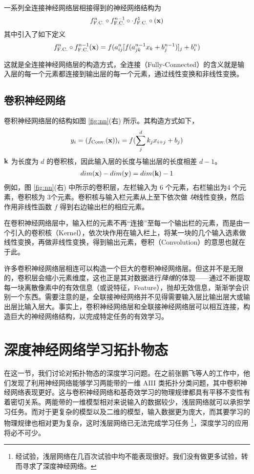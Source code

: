 一系列全连接神经网络层相接得到的神经网络结构为
\begin{align}
f_{\text{F.C.}}^n\circ f_{\text{F.C.}}^{n-1}\circ \cdot f_{\text{F.C.}}^1\circ(\mathbf{x})
\end{align}
其中引入了如下定义
\begin{align}
f_{\text{F.C.}}^{n}\circ f_{\text{F.C.}}^{n-1}(\mathbf{x})
= f(a^{n}_{ij}[f(a^{n-1}_{jk}x_k + b^{n-1}_j)]_{j} + b^n_i)
\end{align}

这就是全连接神经网络层的构造方式，全连接（Fully-Connected）的含义就是输入层的每一个元素都连接到输出层的每一个元素，通过线性变换和非线性变换。




\subsection{卷积神经网络}
卷积神经网络层的结构如图 \ref{fig:nn}(右) 所示。其构造方式如下，
\begin{align}
y_i = (f_{\text{Conv.}}(\mathbf{x}))_i = f(\sum_j^{d}k_jx_{i+j}+b_j)
\end{align}
$\mathbf{k}$ 为长度为 $d$ 的卷积核，因此输入层的长度与输出层的长度相差 $d-1$。
\begin{align}
dim(\mathbf{x}) - dim(\mathbf{y}) = dim(\mathbf{k}) - 1
\end{align}
例如，图 \ref{fig:nn}(右) 中所示的卷积层，左栏输入为 6 个元素，右栏输出为4 个元素，卷积核为 3个元素。卷积核与输入栏元素从上至下依次做 \textit{块}线性变换，然后作用非线性函数 $f$ 得到右边输出栏的相应元素。

在卷积神经网络层中，输入栏的元素不再“连接”至每一个输出栏的元素，而是由一个引入的卷积核（Kernel），依次块作用在输入栏上，将某一块的几个输入选素做线性变换，再做非线性变换，得到输出元素，卷积（Convolution）的意思也就在于此。

许多卷积神经网络层相连可以构造一个巨大的卷积神经网络层。但这并不是无限的，卷积层会缩小元素维度，这也正是其对数据进行\textit{降维}的体现——通过不断提取每一块离散像素中的有效信息（或说特征，Feature），抛却无效信息，渐渐学会识别一个东西。需要注意的是，全联接神经网络并不见得需要输入层比输出层大或输出层比输入层大。事实上，卷积神经网络层和全联接神经网络层可以相互连接，构造巨大的神经网络结构，以完成特定任务的有效学习。




\section{深度神经网络学习拓扑物态} \label{sec:topoml}
在这一节，我们讨论对拓扑物态的深度学习问题。在之前张鹏飞等人的工作中，他们发现了利用神经网络能够学习两能带的一维 AIII 类拓扑分类问题，其中卷积神经网络表现更好。这与卷积神经网络和基奇效学习的物理规律都具有平移不变性有着密切关系。两能带的一维模型相对来说输入的数据较少，浅层网络就可以承担学习任务。而对于更复杂的模型以及二维的模型，输入数据更为庞大，而其要学习的物理规律也相对更为复杂，这时浅层网络已无法完成学习任务
\footnote{经试验，浅层网络在几百次试验中均不能表现很好。我们没有做更多试验，转而寻求了深度神经网络。}，深度学习的应用将必不可少。


